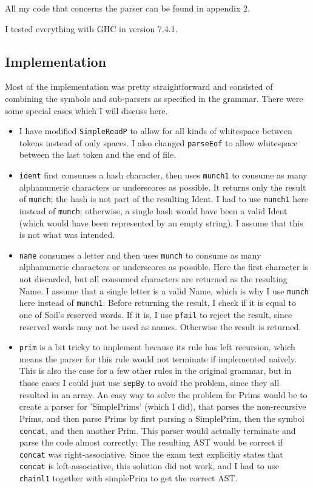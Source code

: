 \documentclass[a4paper]{article}
\begin{document}
All my code that concerns the parser can be found in appendix 2. 

I tested everything with GHC in version 7.4.1.

\subsection*{Implementation}
Most of the implementation was pretty straightforward and consisted of combining the symbols and sub-parsers as specified in the grammar. There were some special cases which I will discuss here.
\begin{itemize}
  \item I have modified \texttt{SimpleReadP} to allow for all kinds of whitespace between tokens instead of only spaces. I also changed \texttt{parseEof} to allow whitespace between the last token and the end of file.
  \item \texttt{ident} first consumes a hash character, then uses \texttt{munch1} to consume as many alphanumeric characters or underscores as possible. It returns only the result of \texttt{munch}; the hash is not part of the resulting Ident. I had to use \texttt{munch1} here instead of \texttt{munch}; otherwise, a single hash would have been a valid Ident (which would have been represented by an empty string). I assume that this is not what was intended.
  \item \texttt{name} consumes a letter and then uses \texttt{munch} to consume as many alphanumeric characters or underscores as possible. Here the first character is not discarded, but all consumed characters are returned as the resulting Name. I assume that a single letter is a valid Name, which is why I use \texttt{munch} here instead of \texttt{munch1}. Before returning the result, I check if it is equal to one of Soil's reserved words. If it is, I use \texttt{pfail} to reject the result, since reserved words may not be used as names. Otherwise the result is returned.
  \item \texttt{prim} is a bit tricky to implement because its rule has left recursion, which means the parser for this rule would not terminate if implemented naively. This is also the case for a few other rules in the original grammar, but in those cases I could just use \texttt{sepBy} to avoid the problem, since they all resulted in an array. An easy way to solve the problem for Prims would be to create a parser for 'SimplePrims' (which I did), that parses the non-recursive Prims, and then parse Prims by first parsing a SimplePrim, then the symbol \texttt{concat}, and then another Prim. This parser would actually terminate and parse the code almost correctly: The resulting AST would be correct if \texttt{concat} was right-associative. Since the exam text explicitly states that \texttt{concat} is left-associative, this solution did not work, and I had to use \texttt{chainl1} together with simplePrim to get the correct AST.

\end{itemize}
\end{document}
